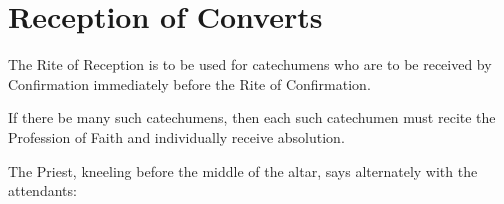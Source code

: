 \section{Reception of Converts}
\fancyhead[RE,LO]{}
\begin{secrubric}
    The Rite of Reception is to be used for catechumens who are to be received by Confirmation immediately before the Rite of Confirmation.
\end{secrubric}
\begin{secrubric}
    If there be many such catechumens, then each such catechumen must recite the Profession of Faith and individually receive absolution.
\end{secrubric}
\begin{secrubric}
    The Priest, kneeling before the middle of the altar, says alternately with the attendants:
\end{secrubric}
